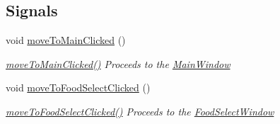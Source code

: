 \subsection*{Signals}
\begin{DoxyCompactItemize}
\item 
void \mbox{\hyperlink{class_results_window_a55bcbc29f4f178f52fc610a09ec21cb3}{move\+To\+Main\+Clicked}} ()
\begin{DoxyCompactList}\small\item\em \mbox{\hyperlink{class_results_window_a55bcbc29f4f178f52fc610a09ec21cb3}{move\+To\+Main\+Clicked()}} Proceeds to the \mbox{\hyperlink{class_main_window}{Main\+Window}} \end{DoxyCompactList}\item 
void \mbox{\hyperlink{class_results_window_a7a545927d8dd85526646a5d05d758052}{move\+To\+Food\+Select\+Clicked}} ()
\begin{DoxyCompactList}\small\item\em \mbox{\hyperlink{class_results_window_a7a545927d8dd85526646a5d05d758052}{move\+To\+Food\+Select\+Clicked()}} Proceeds to the \mbox{\hyperlink{class_food_select_window}{Food\+Select\+Window}} \end{DoxyCompactList}\end{DoxyCompactItemize}
